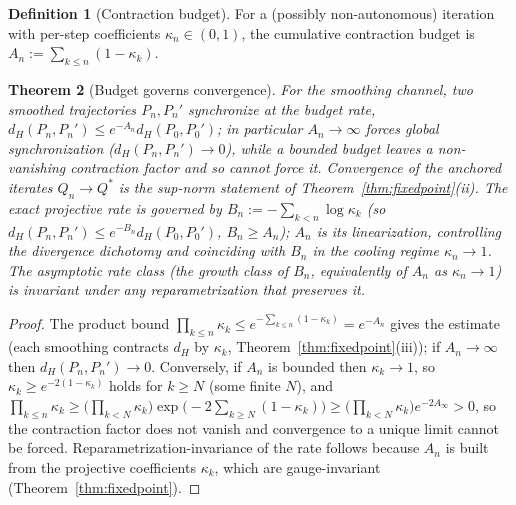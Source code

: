 \documentclass[11pt]{article}
\theoremstyle{plain}
\newtheorem{theorem}{Theorem}[section]
\theoremstyle{definition}
\newtheorem{definition}[theorem]{Definition}
\theoremstyle{remark}
\begin{document}
\begin{definition}[Contraction budget]
For a (possibly non-autonomous) iteration with per-step coefficients $\kappa_n\in(0,1)$, the cumulative contraction budget is $A_n:=\sum_{k\le n}(1-\kappa_k)$.
\end{definition}

\begin{theorem}[Budget governs convergence]\label{thm:budget}
For the smoothing channel, two smoothed trajectories $P_n,P_n'$ synchronize at the budget rate, $d_H(P_n,P_n')\le e^{-A_n}d_H(P_0,P_0')$; in particular $A_n\to\infty$ forces global synchronization ($d_H(P_n,P_n')\to0$), while a bounded budget leaves a non-vanishing contraction factor and so cannot force it. Convergence of the anchored iterates $Q_n\to Q^*$ is the sup-norm statement of Theorem~\ref{thm:fixedpoint}(ii). The exact projective rate is governed by $B_n:=-\sum_{k<n}\log\kappa_k$ (so $d_H(P_n,P_n')\le e^{-B_n}d_H(P_0,P_0')$, $B_n\ge A_n$); $A_n$ is its linearization, controlling the divergence dichotomy and coinciding with $B_n$ in the cooling regime $\kappa_n\to1$. The asymptotic rate class (the growth class of $B_n$, equivalently of $A_n$ as $\kappa_n\to1$) is invariant under any reparametrization that preserves it.
\end{theorem}
\begin{proof}
The product bound $\prod_{k\le n}\kappa_k\le e^{-\sum_{k\le n}(1-\kappa_k)}=e^{-A_n}$ gives the estimate (each smoothing contracts $d_H$ by $\kappa_k$, Theorem~\ref{thm:fixedpoint}(iii)); if $A_n\to\infty$ then $d_H(P_n,P_n')\to0$. Conversely, if $A_n$ is bounded then $\kappa_k\to1$, so $\kappa_k\ge e^{-2(1-\kappa_k)}$ holds for $k\ge N$ (some finite $N$), and $\prod_{k\le n}\kappa_k\ge\big(\prod_{k<N}\kappa_k\big)\exp\!\big(-2\textstyle\sum_{k\ge N}(1-\kappa_k)\big)\ge\big(\prod_{k<N}\kappa_k\big)e^{-2A_\infty}>0$, so the contraction factor does not vanish and convergence to a unique limit cannot be forced. Reparametrization-invariance of the rate follows because $A_n$ is built from the projective coefficients $\kappa_k$, which are gauge-invariant (Theorem~\ref{thm:fixedpoint}).
\end{proof}
\end{document}

